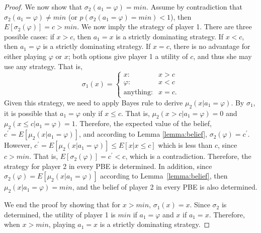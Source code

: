 \documentclass[letterpaper]{article} %
\begin{document}
\begin{proof}
We now show that $\sigma_2(a_1=\varphi) = min$.
Assume by contradiction that $\sigma_2(a_1=\varphi)\neq min$ (or $p(\sigma_2(a_1=\varphi)=min) < 1$), then $E[\sigma_2(\varphi)]=c>min$.
We now imply the strategy of player 1. There are three possible cases: if $x>c$, then $a_1=x$ is a strictly dominating strategy. If $x < c$, then $a_1=\varphi$ is a strictly dominating strategy.
If $x=c$, there is no advantage for either playing $\varphi$ or $x$; both options give player 1 a utility of $c$, and thus she may use any strategy. 
That is,
$$\sigma_1(x)=\begin{cases}x: & x>c \\ \varphi: & x<c \\ \text{anything}: & x=c.\end{cases}$$
%
Given this strategy, we need to apply Bayes rule to derive $\mu_2(x| a_1=\varphi)$. By $\sigma_1$, it is possible that $a_1=\varphi$ only if $x\leq c$. That is, $\mu_2(x>c| a_1=\varphi)=0$ and $\mu_2(x \leq c| a_1=\varphi)=1$. Therefore, the expected value of the belief, $c^\prime = E[\mu_2(x|a_1=\varphi)]$, and according to Lemma \ref{lemma:belief}, $\sigma_2(\varphi) = c^\prime$. However, $c^\prime = E[\mu_2(x|a_1=\varphi)] \leq E[x | x\leq c]$ which is less than $c$, since $c>min$. That is,
$E[\sigma_2(\varphi)]=c^\prime < c$, which is a contradiction.
%
Therefore, the strategy for player 2 in every PBE is determined. In addition, since $\sigma_2(\varphi) = E[\mu_2(x| a_1=\varphi)]$ according to Lemma~\ref{lemma:belief}, then $\mu_2(x| a_1=\varphi)=min$, and the belief of player 2 in every PBE is also determined.

We end the proof by showing that for $x>min$, $\sigma_1(x)=x$. Since $\sigma_2$ is determined, the utility of player 1 is $min$ if $a_1=\varphi$ and $x$ if $a_1=x$. Therefore, when $x>min$, playing $a_1=x$ is a strictly dominating strategy.


\end{proof}
\end{document}
